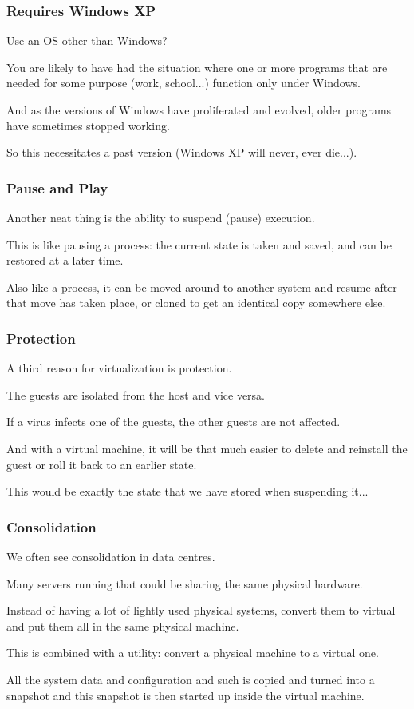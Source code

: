 \begin{frame}
\frametitle{Requires Windows XP}

Use an OS other than Windows? 

You are likely to have had the situation where one or more programs that are needed for some purpose (work, school...) function only under Windows. 

And as the versions of Windows have proliferated and evolved, older programs have sometimes stopped working.

So this necessitates a past version (Windows XP will never, ever die...).

\end{frame}

\begin{frame}
\frametitle{Pause and Play}

Another neat thing is the ability to suspend (pause) execution. 

This is like pausing a process: the current state is taken and saved, and can be restored at a later time. 

Also like a process, it can be moved around to another system and resume after that move has taken place, or cloned to get an identical copy somewhere else.


\end{frame}

\begin{frame}
\frametitle{Protection}

A third reason for virtualization is protection. 

The guests are isolated from the host and vice versa. 

If a virus infects one of the guests, the other guests are not affected. 

And with a virtual machine, it will be that much easier to delete and reinstall the guest or roll it back to an earlier state. 

This would be exactly the state that we have stored when suspending it...


\end{frame}

\begin{frame}
\frametitle{Consolidation}

We often see consolidation in data centres. 

Many servers running that could be sharing the same physical hardware. 

Instead of having a lot of lightly used physical systems, convert them to virtual and put them all in the same physical machine. 

This is combined with a utility: convert a physical machine to a virtual one.

All the system data and configuration and such is copied and turned into a snapshot and this snapshot is then started up inside the virtual machine.

\end{frame}

